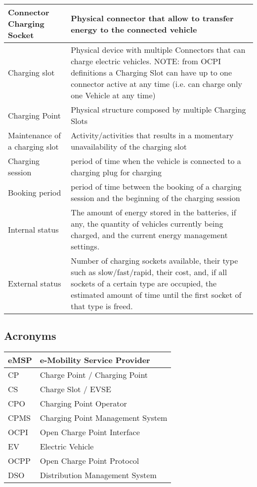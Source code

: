 \begin{tabular}{|p{5cm}|p{10cm}|}
	\hline
	Connector \newline Charging Socket & Physical connector that allow to transfer energy to the connected vehicle\\
	\hline
	Charging slot & Physical device with multiple Connectors that can charge electric vehicles.\newline
	NOTE: from OCPI definitions a Charging Slot can have up to one connector active at any time (i.e. can charge only one Vehicle at any time) \\
	\hline
	Charging Point & Physical structure composed by multiple Charging Slots\\
	\hline
	Maintenance of a charging slot & Activity/activities that results in a momentary unavailability of the charging slot\\
	\hline
	Charging session & period of time when the vehicle is connected to a charging plug for charging\\
	\hline
	Booking period & period of time between the booking of a charging session and the beginning of the charging session\\
	\hline
	Internal status & The amount of energy stored in the batteries, if any, the quantity of vehicles currently being charged, and the current energy management settings. \\
	\hline
	External status &  Number of charging sockets available, their type such as slow/fast/rapid, their cost, and, if all sockets of a certain type are occupied, the estimated amount of time until the first socket of that type is freed. \\
	\hline
	
	
\end{tabular}

\subsection{Acronyms}
\begin{tabular}{|l|l|}
	\hline
	eMSP & e-Mobility Service Provider\\
	\hline
	CP & Charge Point / Charging Point\\
	\hline
	CS & Charge Slot / EVSE\\
	\hline
	CPO & Charging Point Operator\\
	\hline
	CPMS & Charging Point Management System\\
	\hline
	OCPI & Open Charge Point Interface\\
	\hline
	EV & Electric Vehicle\\
	\hline
	OCPP & Open Charge Point Protocol\\
	\hline
	DSO & Distribution Management System \\
	\hline
\end{tabular}

